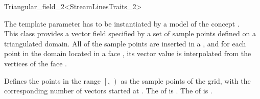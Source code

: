 

\begin{ccRefClass}{Triangular_field_2<StreamLinesTraits_2>}  %

\ccDefinition

The template parameter  has to be
instantiated by a model of the concept .\\
This class provides a vector field specified by a set of sample points defined on a triangulated domain. All of the sample points are inserted in a , and for each point  in the domain located in a face , its vector value is interpolated from the vertices of the face . 

\ccCreation
{}  %


\ccThreeToTwo
{}
{		Defines the points in the range  
		$\left[\right.$, $\left.\right)$ 
		as the sample points of the grid, with the corresponding number of vectors started at .
\ccPrecond The  of  is .
\ccPrecond The  of  is .}

\ccIsModel 

 \\


\ccSeeAlso
{} \\
\end{ccRefClass}


